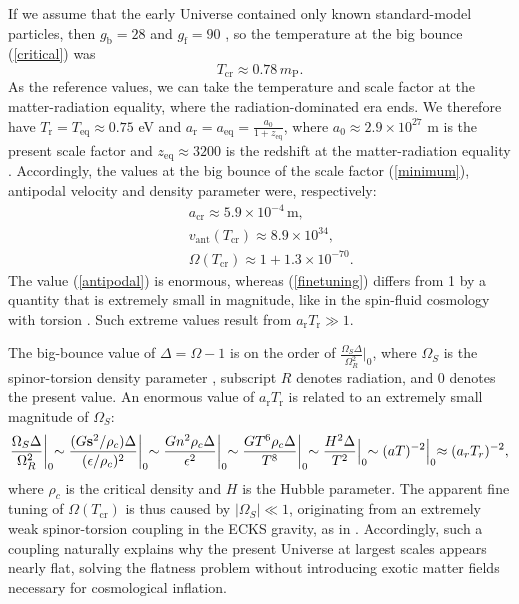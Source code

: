\documentclass[prd,onecolumn,nofootinbib,showpacs]{revtex4}
\begin{document}
If we assume that the early Universe contained only known standard-model particles, then $g_\textrm{b}=28$ and $g_\textrm{f}=90$ \cite{cosmo}, so the temperature at the big bounce (\ref{critical}) was
\begin{equation}
T_\textrm{cr}\approx 0.78\,m_{\textrm{P}}.
\label{temperature}
\end{equation}
As the reference values, we can take the temperature and scale factor at the matter-radiation equality, where the radiation-dominated era ends.
We therefore have $T_\textrm{r}=T_\textrm{eq}\approx 0.75$ eV and $a_\textrm{r}=a_\textrm{eq}=\frac{a_0}{1+z_\textrm{eq}}$, where $a_0\approx 2.9\times10^{27}$ m is the present scale factor \cite{infl} and $z_\textrm{eq}\approx 3200$ is the redshift at the matter-radiation equality \cite{cosmo}.
Accordingly, the values at the big bounce of the scale factor (\ref{minimum}), antipodal velocity and density parameter were, respectively:
\begin{eqnarray}
& & a_\textrm{cr}\approx 5.9\times10^{-4}\,\mbox{m}, \label{scalefactor} \\
& & v_\textrm{ant}(T_\textrm{cr})\approx 8.9\times 10^{34}, \label{antipodal} \\
& & \Omega(T_\textrm{cr})\approx 1+1.3\times 10^{-70}.
\label{finetuning}
\end{eqnarray}
The value (\ref{antipodal}) is enormous, whereas (\ref{finetuning}) differs from 1 by a quantity that is extremely small in magnitude, like in the spin-fluid cosmology with torsion \cite{infl}.
Such extreme values result from $a_\textrm{r} T_\textrm{r}\gg 1$.

The big-bounce value of $\Delta=\Omega-1$ is on the order of $\frac{\Omega_S\Delta}{\Omega^2_R}\bigl|_0$, where $\Omega_S$ is the spinor-torsion density parameter \cite{infl}, subscript $R$ denotes radiation, and 0 denotes the present value.
An enormous value of $a_\textrm{r} T_\textrm{r}$ is related to an extremely small magnitude of $\Omega_S$:
\begin{equation}
\frac{\Omega_S\Delta}{\Omega^2_R}\biggl|_0\sim\frac{(G{\bf s}^2/\rho_c)\Delta}{(\epsilon/\rho_c)^2}\biggl|_0\sim\frac{Gn^2\rho_c\Delta}{\epsilon^2}\biggl|_0\sim\frac{GT^6\rho_c\Delta}{T^8}\biggl|_0\sim\frac{H^2\Delta}{T^2}\Bigl|_0\sim(aT)^{-2}\Bigl|_0\approx(a_r T_r)^{-2},
\label{scaling_infl}
\end{equation}
where $\rho_c$ is the critical density and $H$ is the Hubble parameter.
The apparent fine tuning of $\Omega(T_\textrm{cr})$ is thus caused by $|\Omega_S|\ll 1$, originating from an extremely weak spinor-torsion coupling in the ECKS gravity, as in \cite{infl}.
Accordingly, such a coupling naturally explains why the present Universe at largest scales appears nearly flat, solving the flatness problem without introducing exotic matter fields necessary for cosmological inflation.
\end{document}
